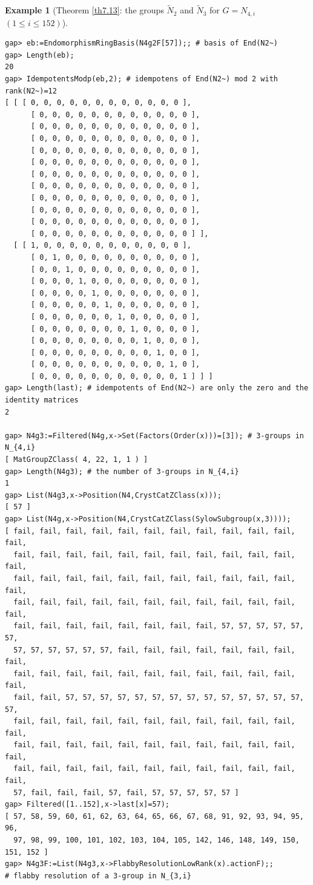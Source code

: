 \documentclass{amsart}
\theoremstyle{plain}
\theoremstyle{definition}
\newtheorem{example}[theorem]{Example}
\theoremstyle{remark}
\begin{document}
\begin{example}[Theorem \ref{th7.13}: the groups $\widetilde{N}_2$ and $\widetilde{N}_3$ for $G=N_{4,i}$ $(1\leq i\leq 152)$]
\begin{verbatim}
gap> eb:=EndomorphismRingBasis(N4g2F[57]);; # basis of End(N2~)
gap> Length(eb);
20
gap> IdempotentsModp(eb,2); # idempotens of End(N2~) mod 2 with rank(N2~)=12
[ [ [ 0, 0, 0, 0, 0, 0, 0, 0, 0, 0, 0, 0 ], 
      [ 0, 0, 0, 0, 0, 0, 0, 0, 0, 0, 0, 0 ], 
      [ 0, 0, 0, 0, 0, 0, 0, 0, 0, 0, 0, 0 ], 
      [ 0, 0, 0, 0, 0, 0, 0, 0, 0, 0, 0, 0 ], 
      [ 0, 0, 0, 0, 0, 0, 0, 0, 0, 0, 0, 0 ], 
      [ 0, 0, 0, 0, 0, 0, 0, 0, 0, 0, 0, 0 ], 
      [ 0, 0, 0, 0, 0, 0, 0, 0, 0, 0, 0, 0 ], 
      [ 0, 0, 0, 0, 0, 0, 0, 0, 0, 0, 0, 0 ], 
      [ 0, 0, 0, 0, 0, 0, 0, 0, 0, 0, 0, 0 ], 
      [ 0, 0, 0, 0, 0, 0, 0, 0, 0, 0, 0, 0 ], 
      [ 0, 0, 0, 0, 0, 0, 0, 0, 0, 0, 0, 0 ], 
      [ 0, 0, 0, 0, 0, 0, 0, 0, 0, 0, 0, 0 ] ], 
  [ [ 1, 0, 0, 0, 0, 0, 0, 0, 0, 0, 0, 0 ], 
      [ 0, 1, 0, 0, 0, 0, 0, 0, 0, 0, 0, 0 ], 
      [ 0, 0, 1, 0, 0, 0, 0, 0, 0, 0, 0, 0 ], 
      [ 0, 0, 0, 1, 0, 0, 0, 0, 0, 0, 0, 0 ], 
      [ 0, 0, 0, 0, 1, 0, 0, 0, 0, 0, 0, 0 ], 
      [ 0, 0, 0, 0, 0, 1, 0, 0, 0, 0, 0, 0 ], 
      [ 0, 0, 0, 0, 0, 0, 1, 0, 0, 0, 0, 0 ], 
      [ 0, 0, 0, 0, 0, 0, 0, 1, 0, 0, 0, 0 ], 
      [ 0, 0, 0, 0, 0, 0, 0, 0, 1, 0, 0, 0 ], 
      [ 0, 0, 0, 0, 0, 0, 0, 0, 0, 1, 0, 0 ], 
      [ 0, 0, 0, 0, 0, 0, 0, 0, 0, 0, 1, 0 ], 
      [ 0, 0, 0, 0, 0, 0, 0, 0, 0, 0, 0, 1 ] ] ]
gap> Length(last); # idempotents of End(N2~) are only the zero and the identity matrices 
2

gap> N4g3:=Filtered(N4g,x->Set(Factors(Order(x)))=[3]); # 3-groups in N_{4,i}
[ MatGroupZClass( 4, 22, 1, 1 ) ]
gap> Length(N4g3); # the number of 3-groups in N_{4,i}
1
gap> List(N4g3,x->Position(N4,CrystCatZClass(x)));
[ 57 ]
gap> List(N4g,x->Position(N4,CrystCatZClass(SylowSubgroup(x,3))));
[ fail, fail, fail, fail, fail, fail, fail, fail, fail, fail, fail, fail, 
  fail, fail, fail, fail, fail, fail, fail, fail, fail, fail, fail, fail, 
  fail, fail, fail, fail, fail, fail, fail, fail, fail, fail, fail, fail, 
  fail, fail, fail, fail, fail, fail, fail, fail, fail, fail, fail, fail, 
  fail, fail, fail, fail, fail, fail, fail, fail, 57, 57, 57, 57, 57, 57, 
  57, 57, 57, 57, 57, 57, fail, fail, fail, fail, fail, fail, fail, fail, 
  fail, fail, fail, fail, fail, fail, fail, fail, fail, fail, fail, fail, 
  fail, fail, 57, 57, 57, 57, 57, 57, 57, 57, 57, 57, 57, 57, 57, 57, 57, 
  fail, fail, fail, fail, fail, fail, fail, fail, fail, fail, fail, fail, 
  fail, fail, fail, fail, fail, fail, fail, fail, fail, fail, fail, fail, 
  fail, fail, fail, fail, fail, fail, fail, fail, fail, fail, fail, fail, 
  57, fail, fail, fail, 57, fail, 57, 57, 57, 57, 57 ]
gap> Filtered([1..152],x->last[x]=57);
[ 57, 58, 59, 60, 61, 62, 63, 64, 65, 66, 67, 68, 91, 92, 93, 94, 95, 96, 
  97, 98, 99, 100, 101, 102, 103, 104, 105, 142, 146, 148, 149, 150, 151, 152 ]
gap> N4g3F:=List(N4g3,x->FlabbyResolutionLowRank(x).actionF);;
# flabby resolution of a 3-group in N_{3,i}


\end{verbatim}
\end{example}
\end{document}
